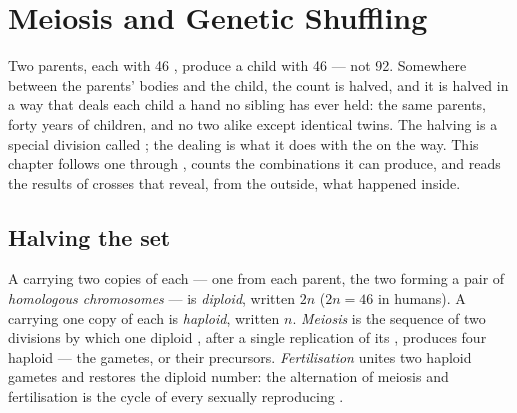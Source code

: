 \chapter{Meiosis and Genetic Shuffling}\label{ch:g12:meiosis-genetic-shuffling}

Two parents, each with 46 , produce a child with 46 --- not
92. Somewhere between the parents' bodies and the child, the count is
halved, and it is halved in a way that deals each child a hand no
sibling has ever held: the same parents, forty years of children, and
no two alike except identical twins. The halving is a special division
called ; the dealing is what it does with the  on the
way. This chapter follows one  through , counts the
combinations it can produce, and reads the results of crosses that
reveal, from the outside, what happened inside.

\section{Halving the set}

\begin{definition}\label{def:g12:meiosis-genetic-shuffling:meiosis}
A  carrying two copies of each  --- one from each parent,
the two forming a pair of \emph{homologous chromosomes} --- is
\emph{diploid}, written $2n$ ($2n = 46$ in humans). A
 carrying one copy of each is \emph{haploid},
written $n$. \emph{Meiosis} is the sequence of two
divisions by which one diploid , after a single replication of its
, produces four haploid  --- the gametes, or their precursors.
\emph{Fertilisation} unites two haploid gametes and restores the
diploid number: the alternation of meiosis and fertilisation is the
cycle of every sexually reproducing .
\end{definition}

